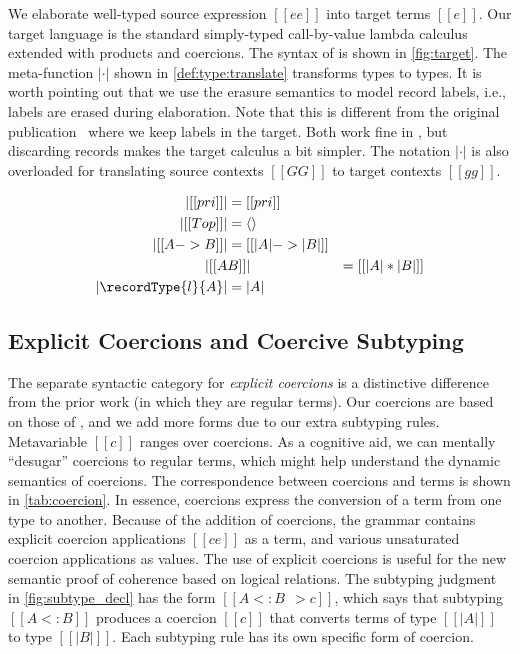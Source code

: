 We elaborate well-typed source expression $[[ee]]$ into target terms $[[e]]$.
Our target language \tname is the standard simply-typed call-by-value lambda
calculus extended with products and coercions. The syntax of \tname is shown in
\cref{fig:target}. The meta-function $| \cdot |$ shown in
\cref{def:type:translate} transforms \namee types to \tname types. It is worth
pointing out that we use the erasure semantics to model record labels, i.e.,
labels are erased during elaboration. Note that this is different from the
original publication~\citep{bi_et_al:LIPIcs:2018:9227} where we keep labels in
the target. Both work fine in \namee, but discarding records makes the
target calculus a bit simpler.
The notation $| \cdot |$ is also overloaded for
translating source contexts $[[GG]]$ to target contexts $[[gg]]$.

\begin{definition} \label{def:type:translate}
  \begin{align*}
    | [[pri]] | &= [[pri]] \\
    | [[Top]] | &= \langle \rangle \\
    | [[A -> B]]  | &= [[ | A | -> | B |  ]] \\
    | [[ A & B  ]] | &= [[ | A | * | B |  ]] \\
    | \recordType{l}{A} | &= | A |
  \end{align*}
\end{definition}



\subsection{Explicit Coercions and Coercive Subtyping}

The separate syntactic category for \emph{explicit coercions} is a distinctive difference
from the prior work (in which they are regular terms). Our coercions are based
on those of \citet{Henglein_1994}, and we add more forms due to our extra
subtyping rules.
Metavariable $[[c]]$ ranges over coercions.%
As a cognitive aid, we can mentally ``desugar'' coercions to
regular terms, which might help understand the dynamic semantics of coercions. The correspondence
between coercions and terms is shown in \cref{tab:coercion}.
In essence, coercions express the conversion
of a term from one type to another. Because of the addition of coercions, the
grammar contains explicit coercion applications $[[c e]]$ as a term, and various
unsaturated coercion applications as values. The use of explicit coercions is useful for the new semantic
proof of coherence based on logical relations.
The subtyping judgment in \cref{fig:subtype_decl} has the form $[[A <: B ~~> c]]$, which says that
subtyping $[[A <: B]]$ produces a coercion $[[c]]$ that converts
terms of type $[[ |A| ]]$ to type $[[ |B| ]]$. Each subtyping rule has its own
specific form of coercion.


